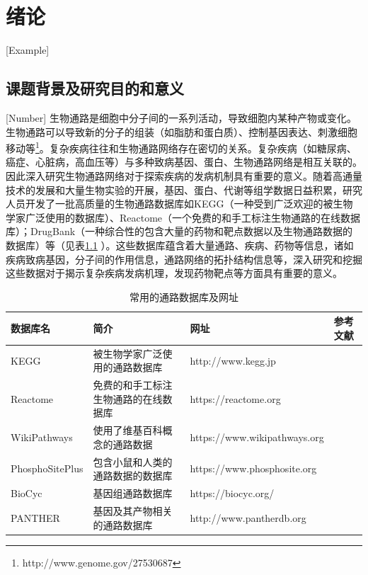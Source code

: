 \chapter{绪论}[Example]

\section{课题背景及研究目的和意义}[Number]
生物通路是细胞中分子间的一系列活动，导致细胞内某种产物或变化。生物通路可以导致新的分子的组装（如脂肪和蛋白质）、控制基因表达、刺激细胞移动等\footnote{http://www.genome.gov/27530687}。复杂疾病往往和生物通路网络存在密切的关系。复杂疾病（如糖尿病、癌症、心脏病，高血压等）与多种致病基因、蛋白、生物通路网络是相互关联的\cite{jin2011systematic}。因此深入研究生物通路网络对于探索疾病的发病机制具有重要的意义。随着高通量技术的发展和大量生物实验的开展，基因、蛋白、代谢等组学数据日益积累，研究人员开发了一批高质量的生物通路数据库如KEGG\cite{kanehisa2008kegg}（一种受到广泛欢迎的被生物学家广泛使用的数据库）、Reactome\cite{croft2013reactome}（一个免费的和手工标注生物通路的在线数据库）；DrugBank\cite{wishart2006drugbank}（一种综合性的包含大量的药物和靶点数据以及生物通路数据的数据库）等（见表\ref{table1} ）。这些数据库蕴含着大量通路、疾病、药物等信息，诸如疾病致病基因，分子间的作用信息，通路网络的拓扑结构信息等，深入研究和挖掘这些数据对于揭示复杂疾病发病机理，发现药物靶点等方面具有重要的意义。




\begin{table}[htbp]
  \centering
	\caption[table1]{常用的通路数据库及网址}
\vspace{0.5em}\wuhao
\begin{tabularx}{1.0\textwidth}{lXXl}
\toprule[1.5pt]
数据库名 & 简介 & 网址 & 参考文献\\
\midrule[1pt]
KEGG & 被生物学家广泛使用的通路数据库 & http://www.kegg.jp & \cite{kanehisa2008kegg} \\
Reactome	& 免费的和手工标注生物通路的在线数据库	& https://reactome.org & \cite{croft2013reactome} \\
WikiPathways	& 使用了维基百科概念的通路数据	& https://www.wikipathways.org & \cite{pico2008wikipathways} \\
PhosphoSitePlus	& 包含小鼠和人类的通路数据的数据库 & https://www.phosphosite.org &	\cite{hornbeck2011phosphositeplus} \\
BioCyc 	& 基因组通路数据库& https://biocyc.org/	& \cite{krummenacker2005querying} \\
PANTHER	& 基因及其产物相关的通路数据库&http://www.pantherdb.org	& \cite{mi2016panther} \\
\bottomrule[1.5pt]
\end{tabularx}
\label{table1}
\end{table}

